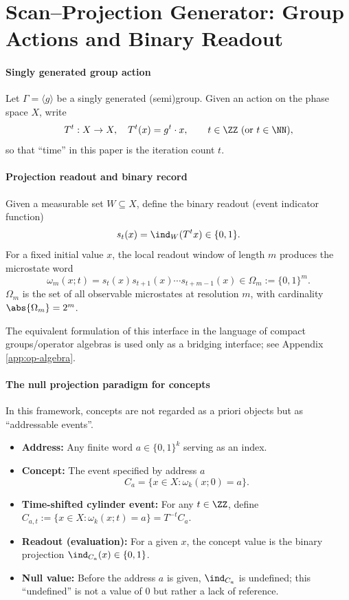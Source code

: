 \section{Scan--Projection Generator: Group Actions and Binary Readout}\label{sec:spg}

\paragraph{Singly generated group action}

Let $\Gamma=\langle g\rangle$ be a singly generated (semi)group. Given an action on the phase space $X$, write
\[
T^t:X\to X,\quad T^t(x)=g^t\cdot x,\qquad t\in\ZZ\ (\text{or }t\in\NN),
\]
so that ``time'' in this paper is the iteration count $t$.

\paragraph{Projection readout and binary record}

Given a measurable set $W\subseteq X$, define the binary readout (event indicator function)
\[
s_t(x)=\ind_W(T^t x)\in\{0,1\}.
\]
For a fixed initial value $x$, the local readout window of length $m$ produces the microstate word
\[
\omega_m(x;t)=s_t(x)s_{t+1}(x)\cdots s_{t+m-1}(x)\in \Omega_m:=\{0,1\}^m.
\]
$\Omega_m$ is the set of all observable microstates at resolution $m$, with cardinality $\abs{\Omega_m}=2^m$.

The equivalent formulation of this interface in the language of compact groups/operator algebras is used only as a bridging interface; see Appendix \ref{app:op-algebra}.

\paragraph{The null projection paradigm for concepts}

In this framework, concepts are not regarded as a priori objects but as ``addressable events''.
\begin{itemize}
  \item \textbf{Address:} Any finite word $a\in\{0,1\}^k$ serving as an index.
  \item \textbf{Concept:} The event specified by address $a$
  \[
  C_a=\{x\in X:\omega_k(x;0)=a\}.
  \]
  \item \textbf{Time-shifted cylinder event:} For any $t\in\ZZ$, define $C_{a,t}:=\{x\in X:\omega_k(x;t)=a\}=T^{-t}C_a$.
  \item \textbf{Readout (evaluation):} For a given $x$, the concept value is the binary projection $\ind_{C_a}(x)\in\{0,1\}$.
\item \textbf{Null value:} Before the address $a$ is given, $\ind_{C_a}$ is undefined; this ``undefined'' is not a value of $0$ but rather a lack of reference.
\end{itemize}

